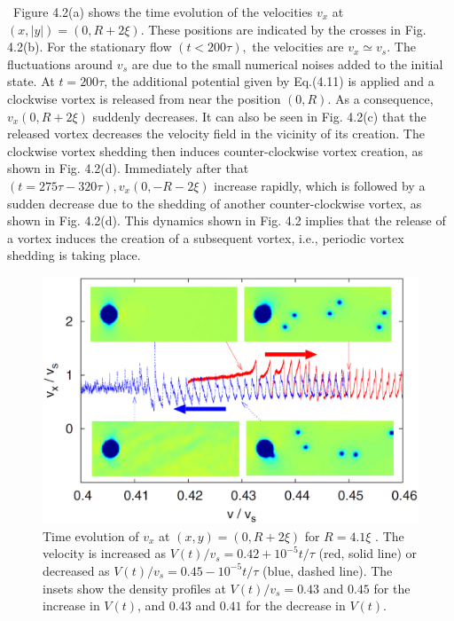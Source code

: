 \documentclass[12pt,a4paper]{report}
\begin{document}
\ Figure 4.2(a) shows the time evolution of the velocities
$v_x$ at $ \left( x, |y| \right) = \left( 0, R + 2 \xi \right)$. 
These positions are indicated by the crosses in Fig. 4.2(b).
For the stationary flow $(t < 200 \tau),$ the velocities are 
$v_x \simeq v_s$. The fluctuations around $v_s$ are due to
the small numerical noises added
to the initial state. At $t=200 \tau$, the additional potential
given by Eq.(4.11) is applied and a clockwise vortex is 
released from near the position $\left( 0, R \right)$. As a consequence,
$v_x \left( 0, R+ 2 \xi \right)$ suddenly decreases. It can also be seen in
Fig. 4.2(c) that the released vortex decreases the velocity
field in the vicinity of its creation. The clockwise vortex
shedding then induces counter-clockwise vortex creation,
as shown in Fig. 4.2(d). Immediately after that $(t=275 \tau -320 \tau),
v_x(0,-R-2\xi)$ increase rapidly, which is followed
by a sudden decrease due to the shedding of another
counter-clockwise vortex, as shown in Fig. 4.2(d). This
dynamics shown in Fig. 4.2 implies that the release of a
vortex induces the creation of a subsequent vortex, i.e.,
periodic vortex shedding is taking place.
\\
\begin{figure}[htbp]
\begin{center}
\includegraphics[scale=0.30, keepaspectratio]{4-3.eps}
\caption{
Time evolution of $v_x$ at $(x,y) = (0,R +
2 \xi)$ for $R = 4.1 \xi$ . The velocity is increased as $V(t)/v_s = 0.42 +
10^{-5}t/ \tau$ (red, solid line) or decreased as $V(t)/v_s = 0.45-10^{-5}t/\tau$
(blue, dashed line). The insets show the density profiles at $V(t)/v_s =
0.43$ and $0.45$ for the increase in $V(t)$, and $0.43$ and $0.41$ for the
decrease in $V(t)$.
}
\label{FIG:4-3}
\end{center}
\end{figure}
\end{document}
